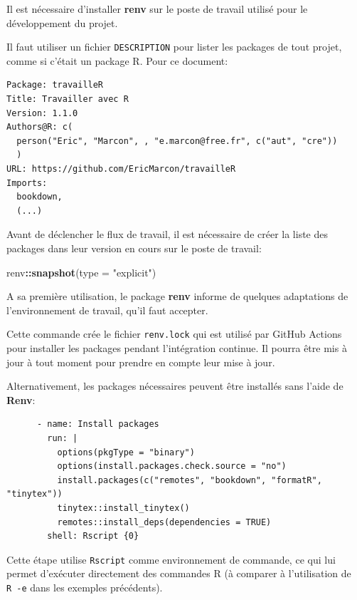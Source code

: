 \documentclass[
  12pt,
  french,
  a4paper,
  extrafontsizes,onecolumn,openright
  ]{memoir}
\newenvironment{Shaded}{\begin{snugshade}}{\end{snugshade}}
\newcommand{\DataTypeTok}[1]{\textcolor[rgb]{0.13,0.29,0.53}{#1}}
\newcommand{\KeywordTok}[1]{\textcolor[rgb]{0.13,0.29,0.53}{\textbf{#1}}}
\newcommand{\NormalTok}[1]{#1}
\newcommand{\OperatorTok}[1]{\textcolor[rgb]{0.81,0.36,0.00}{\textbf{#1}}}
\newcommand{\StringTok}[1]{\textcolor[rgb]{0.31,0.60,0.02}{#1}}
\begin{document}
Il est nécessaire d'installer \textbf{renv} sur le poste de travail utilisé pour le développement du projet.

Il faut utiliser un fichier \texttt{DESCRIPTION} pour lister les packages de tout projet, comme si c'était un package R.
Pour ce document:

\begin{verbatim}
Package: travailleR
Title: Travailler avec R
Version: 1.1.0
Authors@R: c(
  person("Eric", "Marcon", , "e.marcon@free.fr", c("aut", "cre"))
  )
URL: https://github.com/EricMarcon/travailleR
Imports:
  bookdown,
  (...)
\end{verbatim}

Avant de déclencher le flux de travail, il est nécessaire de créer la liste des packages dans leur version en cours sur le poste de travail:

\scriptsize

\begin{Shaded}
\begin{Highlighting}[]
\NormalTok{renv}\OperatorTok{::}\KeywordTok{snapshot}\NormalTok{(}\DataTypeTok{type =} \StringTok{"explicit"}\NormalTok{)}
\end{Highlighting}
\end{Shaded}

\normalsize

A sa première utilisation, le package \textbf{renv} informe de quelques adaptations de l'environnement de travail, qu'il faut accepter.

Cette commande crée le fichier \texttt{renv.lock} qui est utilisé par GitHub Actions pour installer les packages pendant l'intégration continue.
Il pourra être mis à jour à tout moment pour prendre en compte leur mise à jour.

Alternativement, les packages nécessaires peuvent être installés sans l'aide de \textbf{Renv}:

\begin{verbatim}
      - name: Install packages
        run: |
          options(pkgType = "binary")
          options(install.packages.check.source = "no")
          install.packages(c("remotes", "bookdown", "formatR", "tinytex"))
          tinytex::install_tinytex()
          remotes::install_deps(dependencies = TRUE)
        shell: Rscript {0}
\end{verbatim}

Cette étape utilise \texttt{Rscript} comme environnement de commande, ce qui lui permet d'exécuter directement des commandes R (à comparer à l'utilisation de \texttt{R\ -e} dans les exemples précédents).
\end{document}
